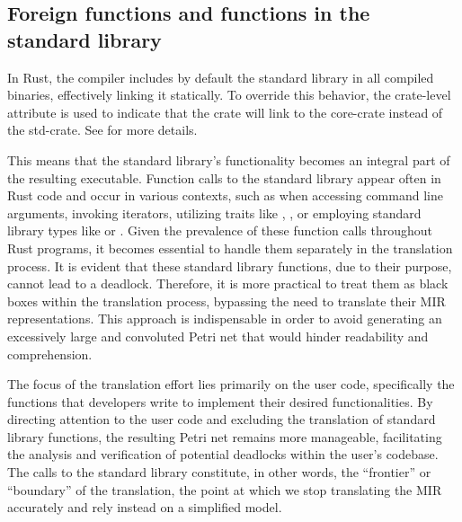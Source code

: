 \subsection{Foreign functions and functions in the standard library}

In Rust, the compiler includes by default
the standard library in all compiled binaries, effectively linking it statically.
To override this behavior, the crate-level attribute \Rustinline{#![no_std]}
is used to indicate that the crate will link to the core-crate instead of the std-crate.
See \cite{embedded-book} for more details.

This means that the standard library's functionality becomes an integral part of the resulting executable.
Function calls to the standard library appear often in Rust code and occur in various contexts,
such as when accessing command line arguments, invoking iterators,
utilizing traits like , ,
or employing standard library types like  or .
Given the prevalence of these function calls throughout Rust programs,
it becomes essential to handle them separately in the translation process.
It is evident that these standard library functions, due to their purpose, cannot lead to a deadlock.
Therefore, it is more practical to treat them as black boxes within the translation process,
bypassing the need to translate their MIR representations.
This approach is indispensable in order to avoid generating
an excessively large and convoluted Petri net that would hinder readability and comprehension.

The focus of the translation effort lies primarily on the user code, specifically
the functions that developers write to implement their desired functionalities.
By directing attention to the user code and excluding the translation of standard library functions,
the resulting Petri net remains more manageable,
facilitating the analysis and verification of potential deadlocks within the user's codebase.
The calls to the standard library constitute, in other words,
the ``frontier'' or ``boundary'' of the translation,
the point at which we stop translating the \acrshort{MIR} accurately
and rely instead on a simplified model.

